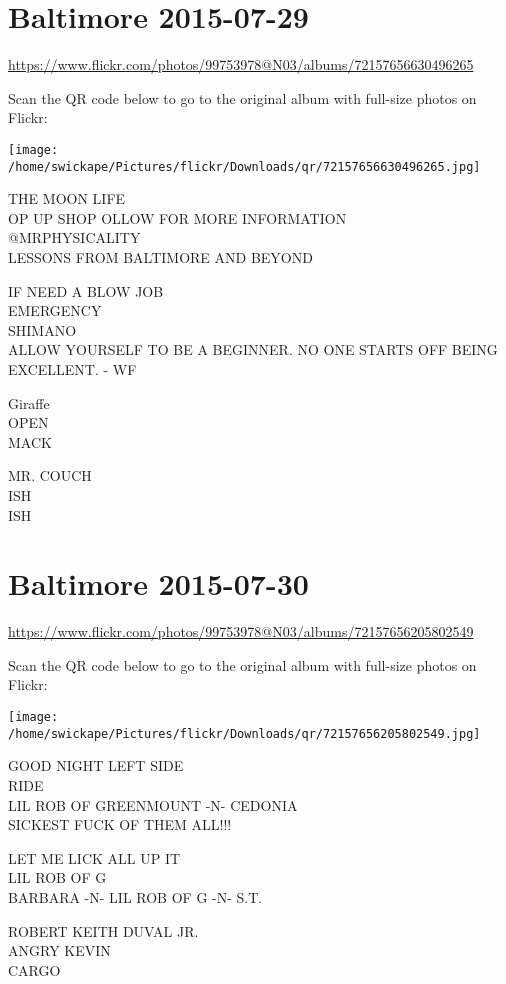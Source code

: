 \documentclass[10pt,letterpaper]{article}
\begin{document}
\section*{Baltimore 2015-07-29}

\url{https://www.flickr.com/photos/99753978@N03/albums/72157656630496265}

Scan the QR code below to go to the original album with full-size photos on Flickr:

\texttt{[image: /home/swickape/Pictures/flickr/Downloads/qr/72157656630496265.jpg]}
\pagebreak

THE MOON LIFE\\
OP UP SHOP OLLOW FOR MORE INFORMATION\\
@MRPHYSICALITY\\
LESSONS FROM BALTIMORE AND BEYOND

IF NEED A BLOW JOB\\
EMERGENCY\\
SHIMANO\\
ALLOW YOURSELF TO BE A BEGINNER.  NO ONE STARTS OFF BEING EXCELLENT.  {-} WF

Giraffe\\
OPEN\\
MACK

MR. COUCH\\
ISH\\
ISH
\pagebreak

\section*{Baltimore 2015-07-30}

\url{https://www.flickr.com/photos/99753978@N03/albums/72157656205802549}

Scan the QR code below to go to the original album with full-size photos on Flickr:

\texttt{[image: /home/swickape/Pictures/flickr/Downloads/qr/72157656205802549.jpg]}
\pagebreak

GOOD NIGHT LEFT SIDE\\
RIDE\\
LIL ROB OF GREENMOUNT {-}N{-} CEDONIA\\
SICKEST FUCK OF THEM ALL!!!

LET ME LICK ALL UP IT\\
LIL ROB OF G\\
BARBARA {-}N{-} LIL ROB OF G {-}N{-} S.T.

ROBERT KEITH DUVAL JR.\\
ANGRY KEVIN\\
CARGO
\end{document}
